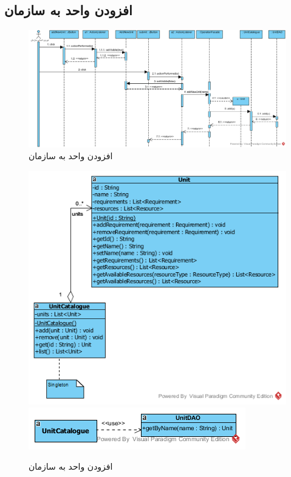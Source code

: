 \begin{landscape}
\section{افزودن واحد به سازمان}
\begin{figure}[H]
	\centering
	\includegraphics[scale=0.7]{img/sequence-design/AddUnitToOrganization}
	\caption{افزودن واحد به سازمان}
\end{figure}
\begin{figure}[H]
	\centering
	\includegraphics[scale=0.6]{img/sequence-design/AddUnitToOrganizationC}
	\includegraphics[scale=0.6]{img/sequence-design/AddUnitToOrganizationD}
	\caption{افزودن واحد به سازمان}
\end{figure}


\end{landscape}
